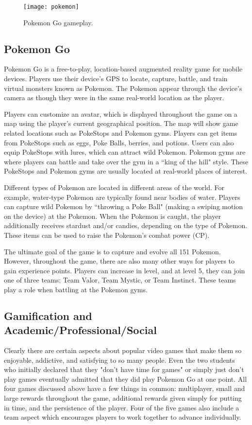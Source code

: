 \begin{figure}[h]
\centering
\texttt{[image: pokemon]}
\caption{Pokemon Go gameplay.}
\end{figure}	
\subsection{Pokemon Go}
Pokemon Go is a free-to-play, location-based augmented reality game for mobile devices. Players use their device's GPS to locate, capture, battle, and train virtual monsters known as Pokemon. The Pokemon appear through the device's camera as though they were in the same real-world location as the player. 

Players can customize an avatar, which is displayed throughout the game on a map using the player's current geographical position. The map will show game related locations such as PokeStops and Pokemon gyms. Players can get items from PokeStops such as eggs, Poke Balls, berries, and potions. Users can also equip PokeStops with lures, which can attract wild Pokemon. Pokemon gyms are where players can battle and take over the gym in a ``king of the hill" style. These PokeStops and Pokemon gyms are usually located at real-world places of interest. 

Different types of Pokemon are located in different areas of the world. For example, water-type Pokemon are typically found near bodies of water. Players can capture wild Pokemon by ``throwing a Poke Ball" (making a swiping motion on the device) at the Pokemon. When the Pokemon is caught, the player additionally receives stardust and/or candies, depending on the type of Pokemon. These items can be used to raise the Pokemon's combat power (CP). 

The ultimate goal of the game is to capture and evolve all 151 Pokemon. However, throughout the game, there are also many other ways for players to gain experience points. Players can increase in level, and at level 5, they can join one of three teams: Team Valor, Team Mystic, or Team Instinct. These teams play a role when battling at the Pokemon gyms. 

\subsection{Gamification and Academic/Professional/Social}
Clearly there are certain aspects about popular video games that make them so enjoyable, addictive, and satisfying to so many people. Even the two students who initially declared that they "don't have time for games" or simply just don't play games eventually admitted that they did play Pokemon Go at one point. All four games discussed above have a few things in common: multiplayer, small and large rewards throughout the game, additional rewards given simply for putting in time, and the persistence of the player. Four of the five games also include a team aspect which encourages players to work together to advance individually. 

